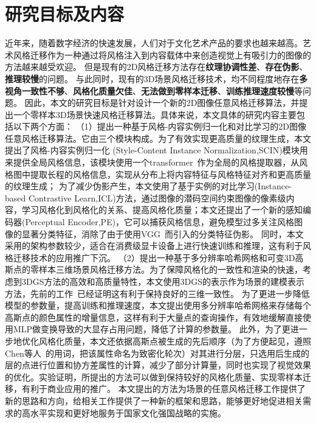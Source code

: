 \section{研究目标及内容}
近年来，随着数字经济的快速发展，人们对于文化艺术产品的要求也越来越高。艺术风格迁移作为一种通过将风格注入到内容载体中来创造视觉上有吸引力的图像的方法越来越受欢迎。
但是现有的2D风格迁移方法存在\textbf{纹理协调性差}、\textbf{存在伪影}、\textbf{推理较慢}的问题。
与此同时，现有的3D场景风格迁移技术，均不同程度地存在\textbf{多视角一致性不够}、\textbf{风格化质量欠佳}、\textbf{无法做到零样本迁移}、\textbf{训练推理速度较慢}等问题。
因此，本文的研究目标是针对设计一个新的2D图像任意风格迁移算法，并提出一个零样本3D场景快速风格迁移算法。具体来说，本文具体的研究内容主要包括以下两个方面：
\newline \indent
（1）提出一种基于风格-内容实例归一化和对比学习的2D图像任意风格迁移算法。它由三个模块构成。为了有效实现更高质量的纹理生成，本文提出了风格-内容实例归一化 (Style-Content Instance Normalization,SCIN)模块用来提供全局风格信息，该模块使用一个transformer~\cite{vaswani2017attention}作为全局的风格提取器，从风格图中提取长程的风格信息，实现从分布上将内容特征与风格特征对齐和更高质量的纹理生成；
为了减少伪影产生，本文使用了基于实例的对比学习(Instance-based Contrastive Learn,ICL)方法，通过图像的潜码空间约束图像的像素级内容，学习风格化到风格化的关系、提高风格化质量；本文还提出了一个新的感知编码器(Perceptual Encoder,PE)，它可以捕获风格信息，避免模型过多关注风格图像的显著分类特征，消除了由于使用VGG~\cite{simonyan2015very}而引入的分类特征伪影。
同时，本文采用的架构参数较少，适合在消费级显卡设备上进行快速训练和推理，这有利于风格迁移技术的应用推广下沉。
\newline \indent
（2）提出一种基于多分辨率哈希网格和可变3D高斯点的零样本三维场景风格迁移方法。为了保障风格化的一致性和渲染的快速，考虑到3DGS方法的高效和高质量特性，本文使用3DGS的表示作为场景的建模表示方法，先前的工作~\cite{liu2024stylegaussian}已经证明这有利于保持良好的三维一致性。
为了更进一步降低模型的参数量，提高训练和推理速度，本文提出使用多分辨率哈希网格来存储每个高斯点的颜色属性的增量信息，这样有利于大量点的查询操作，有效地缓解直接使用MLP做变换导致的大显存占用问题，降低了计算的参数量。
此外，为了更进一步地优化风格化质量，本文还依据高斯点被生成的先后顺序（为了方便起见，遵照Chen等人~\cite{chen2024gaussianeditor}的用词，把该属性命名为致密化轮次）对其进行分层，只选用后生成的层的点进行位置和协方差属性的计算，减少了部分计算量，同时也实现了视觉效果的优化。实验证明，所提出的方法可以做到保持较好的风格化质量、实现零样本迁移，有利于商业应用的推广。
\newline \indent	
本文提出的方法为场景的任意风格迁移工作提供了新的思路和方向，给相关工作提供了一种新的框架和思路，能够更好地促进相关需求的高水平实现和更好地服务于国家文化强国战略的实施。

